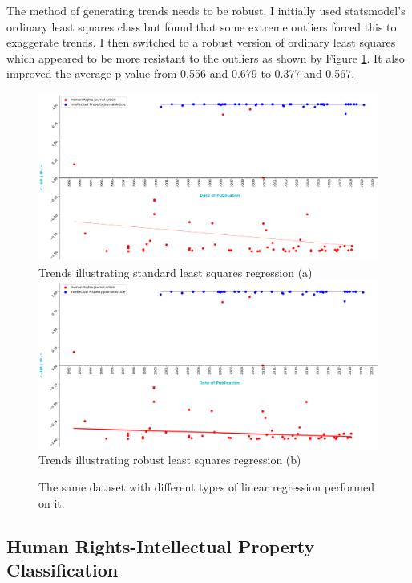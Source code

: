 				The method of generating trends needs to be robust. I initially used statsmodel's ordinary least squares class but found that some extreme outliers forced this to exaggerate trends. I then switched to a robust version of ordinary least squares which appeared to be more resistant to the outliers as shown by Figure \ref{fig:regcomp}. It also improved the average p-value from 0.556 and 0.679 to 0.377 and 0.567.
				\begin{figure}
						\centering
  						\includegraphics[width=\linewidth]{resources/images/reg_stan.png}\\
  						Trends illustrating standard least squares regression (a)
	  				\endminipage\hfill
  						\centering
  						\includegraphics[width=\linewidth]{resources/images/reg_rob.png}\\
  						Trends illustrating robust least squares regression (b)
  					\endminipage\hfill\caption{The same dataset with different types of linear regression performed on it.}\label{fig:regcomp}
				\end{figure}
				
		\subsection{Human Rights-Intellectual Property Classification}\label{sec:hripimp}
